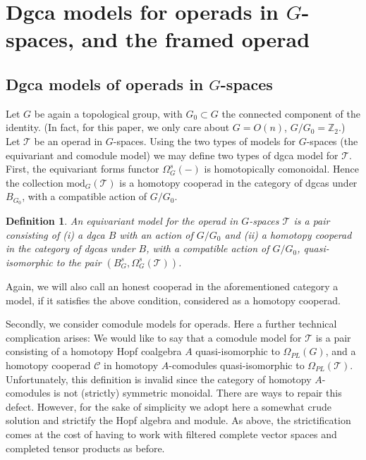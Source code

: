 \documentclass[a4paper]{amsart}
\theoremstyle{plain}
\newtheorem{defi}[thm]{Definition}
\theoremstyle{definition}
\newcommand{\op}{\mathcal}
\renewcommand{\mod}{\mathrm{mod}}
\begin{document}
\section{Dgca models for operads in \texorpdfstring{$G$}{G}-spaces, and the framed operad}\label{sec:dgca models operads}

\subsection{Dgca models of operads in \texorpdfstring{$G$}{G}-spaces}\label{sec:op mod in G space}
Let $G$ be again a topological group, with $G_0\subset G$ the connected component of the identity. (In fact, for this paper, we only care about $G=O(n)$, $G/G_0=\mathbb{Z}_2$.)
Let $\op T$ be an operad in $G$-spaces.
Using the two types of models for $G$-spaces (the equivariant and comodule model) we may define two types of dgca model for $\op T$.
First, the equivariant forms functor $\Omega_G^s(-)$ is homotopically comonoidal.
Hence the collection $\mod_G(\op T)$ is a homotopy cooperad in the category of dgcas under $B_{G_0}$, with a compatible action of $G/G_0$.

\begin{defi}\label{def:equivariant model}
An \emph{equivariant model} for the operad in $G$-spaces $\op T$ is a pair consisting of (i) a dgca $B$ with an action of $G/G_0$ and (ii) a homotopy cooperad in the category of dgcas under $B$, with a compatible action of $G/G_0$, quasi-isomorphic to the pair $(B_G^s,\Omega_G^s(\op T))$.
\end{defi}

Again, we will also call an honest cooperad in the aforementioned category a model, if it satisfies the above condition, considered as a homotopy cooperad. 

Secondly, we consider comodule models for operads.
Here a further technical complication arises: We would like to say that a comodule model for $\op T$ is a pair consisting of a homotopy Hopf coalgebra $A$ quasi-isomorphic to $\Omega_{PL}(G)$, and a homotopy cooperad $\op C$ in homotopy $A$-comodules quasi-isomorphic to $\Omega_{PL}(\op T)$.
Unfortunately, this definition is invalid since the category of homotopy $A$-comodules is not (strictly) symmetric monoidal.
There are ways to repair this defect. However, for the sake of simplicity we adopt here a somewhat crude solution and strictify the Hopf algebra and module.
As above, the strictification comes at the cost of having to work with filtered complete vector spaces and completed tensor products as before.
\end{document}
